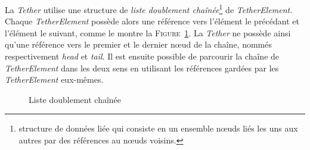 				La \textit{Tether} utilise une structure de \textit{liste doublement chaînée}\footnote{structure de données liée qui consiste en un ensemble n\oe uds liés les uns aux autres par des références au n\oe uds voisins.} de \textit{TetherElement}. Chaque \textit{TetherElement} possède alors une référence vers l'élément le précédant et l'élément le suivant, comme le montre la \textsc{Figure}~\ref{fig:doubly_linked_list}. La \textit{Tether} ne possède ainsi qu'une référence vers le premier et le dernier n\oe ud de la chaîne, nommés respectivement \textit{head} et \textit{tail}. Il est ensuite possible de parcourir la chaîne de \textit{TetherElement} dans les deux sens en utilisant les références gardées par les \textit{TetherElement} eux-mêmes. 
			
				\begin{figure}[!htb]
					\centering
					\caption{Liste doublement chaînée}
					\label{fig:doubly_linked_list}
				\end{figure}

